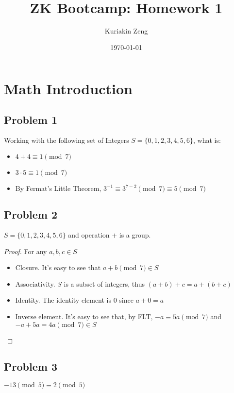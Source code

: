 \documentclass{article}
\title{ZK Bootcamp: Homework 1}
\author{Kuriakin Zeng}
\date\today
\begin{document}
\maketitle %

\section*{Math Introduction}

\subsection*{Problem 1}
Working with the following set of Integers $S = \{0,1,2,3,4,5,6\}$, what is:
\begin{itemize}
\item $4+4 \equiv 1 \pmod 7$
\item $3 \cdot 5 \equiv 1 \pmod 7$
\item By Fermat's Little Theorem, $3^{-1} \equiv 3^{7-2} \pmod 7 \equiv 5 \pmod 7$
\end{itemize}
\subsection*{Problem 2}
$S = \{0, 1, 2, 3, 4, 5, 6\}$ and operation $+$ is a group.
\begin{proof}
For any $a,b,c \in S$
\begin{itemize}
\item Closure. It's easy to see that $a+b \pmod 7 \in S$
\item Associativity. $S$ is a subset of integers, thus $(a+b)+c = a+(b+c)$
\item Identity. The identity element is 0 since $a + 0 = a$
\item Inverse element. It's easy to see that, by FLT, $-a \equiv 5a \pmod 7$ and $-a + 5a = 4a \pmod 7 \in S$
\end{itemize}
\end{proof}
\subsection*{Problem 3}
$-13 \pmod 5 \equiv 2 \pmod 5$
\end{document}
